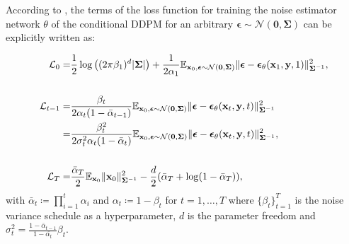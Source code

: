 According to \citet{lee2021priorgrad}, the terms of the loss function for training the noise estimator network $\theta$ of the conditional DDPM for an arbitrary $\boldsymbol{\epsilon}\sim\mathcal{N}(\mathbf{0},\boldsymbol{\Sigma})$ can be explicitly written as: 

\begin{equation}
\begin{aligned}
    \mathcal{L}_0=&\frac{1}{2}\log\left((2\pi\beta_1)^d\lvert\boldsymbol{\Sigma}\rvert\right)+\frac{1}{2\alpha_1}
    \mathbb{E}_{\mathbf{x}_0,\boldsymbol{\epsilon}\sim\mathcal{N}(\mathbf{0},\boldsymbol{\Sigma})}
    \lVert\boldsymbol{\epsilon}-\boldsymbol{\epsilon}_\theta(\mathbf{x}_1,\mathbf{y},1)\rVert^2_{\boldsymbol{\Sigma}^{-1}}, \\\\
    \mathcal{L}_{t-1}=&\frac{\beta_t}{2\alpha_t(1-\bar{\alpha}_{t-1})}\mathbb{E}_{\mathbf{x}_0,\boldsymbol{\epsilon}\sim\mathcal{N}(\mathbf{0},\boldsymbol{\Sigma})}
    \lVert\boldsymbol{\epsilon}-\boldsymbol{\epsilon}_\theta(\mathbf{x}_t,\mathbf{y},t)\rVert^2_{\boldsymbol{\Sigma}^{-1}} \\
    =&\frac{\beta_t^2}{2\sigma_t^2\alpha_t(1-\bar{\alpha}_t)}\mathbb{E}_{\mathbf{x}_0,\boldsymbol{\epsilon}\sim\mathcal{N}(\mathbf{0},\boldsymbol{\Sigma})}
    \lVert\boldsymbol{\epsilon}-\boldsymbol{\epsilon}_\theta(\mathbf{x}_t,\mathbf{y},t)\rVert^2_{\boldsymbol{\Sigma}^{-1}}, \\\\
    \mathcal{L}_T=&\frac{\bar{\alpha}_T}{2}\mathbb{E}_{\mathbf{x}_0}\lVert\mathbf{x}_0\rVert^2_{\boldsymbol{\Sigma}^{-1}}-\frac{d}{2}(\bar{\alpha}_T+\log(1-\bar{\alpha}_T)),
\label{eq: loss terms priorgrad}
\end{aligned}
\end{equation}
with $\bar{\alpha}_t\coloneq\prod_{i=1}^t\alpha_i$ and $\alpha_t\coloneq 1-\beta_t$ for $t=1,\dots,T$ where $\{\beta_t\}_{t=1}^{T}$ is the noise variance schedule as a hyperparameter, $d$ is the parameter freedom and $\sigma_t^2=\frac{1-\bar{\alpha}_{t-1}}{1-\bar{\alpha_t}}\beta_t$.

